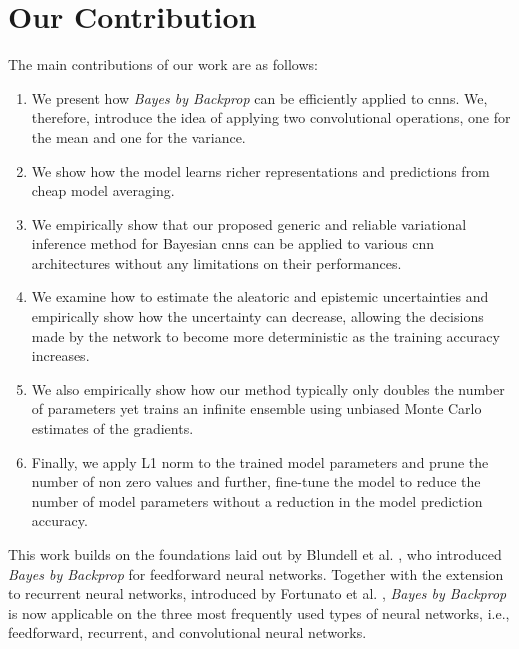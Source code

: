 \section{Our Contribution}
\newline The main contributions of our work are as follows: 
\begin{enumerate}
    \item We present how \textit{Bayes by Backprop} can be efficiently applied to \acp{cnn}. We, therefore, introduce the idea of applying two convolutional operations, one for the mean and one for the variance.
    \item We show how the model learns richer representations and predictions from cheap model averaging.
    \item We empirically show that our proposed generic and reliable variational inference method for Bayesian \acp{cnn} can be applied to various \ac{cnn} architectures without any limitations on their performances. 
    \item We examine how to estimate the aleatoric and epistemic uncertainties and empirically show how the uncertainty can decrease, allowing the decisions made by the network to become more deterministic as the training accuracy increases. 
    \item We also empirically show how our method typically only doubles the number of parameters yet trains an infinite ensemble using unbiased Monte Carlo estimates of the gradients. 
    \item Finally, we apply L1 norm to the trained model parameters and prune the number of non zero values and further, fine-tune the model to reduce the number of model parameters without a reduction in the model prediction accuracy. 
\end{enumerate} 
This work builds on the foundations laid out by Blundell et al. \cite{blundell2015weight}, who introduced \textit{Bayes by Backprop} for feedforward neural networks. Together with the extension to recurrent neural networks, introduced by Fortunato et al. \cite{fortunato2017bayesian}, \textit{Bayes by Backprop} is now applicable on the three most frequently used types of neural networks, i.e., feedforward, recurrent, and convolutional neural networks.


